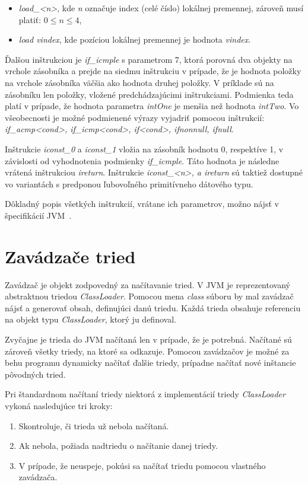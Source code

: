 \documentclass[11pt,final,oneside]{fithesis}
\begin{document}
\begin{itemize}
\item \textit{load\_<n>}, kde \textit{n} označuje index (celé číslo) lokálnej 
premennej, zároveň musí platiť: $0 \leq n \leq 4$,
\item \textit{load vindex}, kde pozíciou lokálnej premennej je hodnota
\textit{vindex}.
\end{itemize}

Ďalšou inštrukciou je \textit{if\_icmple} s parametrom 7, ktorá porovná dva 
objekty na vrchole zásobníka a prejde na siedmu inštrukciu v prípade, že je 
hodnota položky na vrchole zásobníka väčšia ako hodnota druhej položky. V 
príklade sú na zásobníku len položky, vložené predchádzajúcimi inštrukciami.
Podmienka teda platí v prípade, že hodnota parametra \textit{intOne} je menšia
než hodnota \textit{intTwo}. Vo všeobecnosti je možné podmienené výrazy 
vyjadriť pomocou inštrukcií: \textit{if\_acmp<cond>, if\_icmp<cond>, if<cond>,
ifnonnull, ifnull}.

Inštrukcie \textit{iconst\_0} a \textit{iconst\_1} vložia na zásobník hodnotu 
0, respektíve 1, v závislosti od vyhodnotenia podmienky \textit{if\_icmple}. 
Táto hodnota je následne vrátená inštrukciou \textit{ireturn}. Inštrukcie
\textit{iconst\_<n>, a ireturn} sú taktiež dostupné vo variantách s predponou 
ľubovoľného primitívneho dátového typu.

Dôkladný popis všetkých inštrukcií, vrátane ich parametrov, možno nájsť v 
špecifikácií JVM~\cite{Lindholm:2013:JVM:2462629}.

\chapter{Zavádzače tried} 

Zavádzač je objekt zodpovedný za načítavanie tried. V JVM je reprezentovaný 
abstraktnou triedou \textit{ClassLoader}. Pomocou mena \textit{class} súboru by
mal zavádzač nájsť a generovať obsah, definujúci danú triedu. Každá
trieda obsahuje referenciu na objekt typu \textit{ClassLoader}, ktorý ju
definoval.~\cite{Oracle:ClassLoader}

Zvyčajne je trieda do JVM načítaná len v prípade, že je potrebná. Načítané sú 
zároveň všetky triedy, na ktoré sa odkazuje. Pomocou zavádzačov je
možné za behu programu dynamicky načítať ďalšie triedy, prípadne načítať nové 
inštancie pôvodných tried.

Pri štandardnom načítaní triedy niektorá z implementácií triedy 
\textit{ClassLoader} vykoná nasledujúce tri kroky:
\begin{enumerate}
\item Skontroluje, či trieda už nebola načítaná.
\item Ak nebola, požiada nadtriedu o načítanie danej triedy. 
\item V prípade, že neuspeje, pokúsi sa načítať triedu pomocou
vlastného zavádzača.
\end{enumerate}
\end{document}
